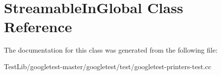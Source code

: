 \hypertarget{classStreamableInGlobal}{}\section{Streamable\+In\+Global Class Reference}
\label{classStreamableInGlobal}


The documentation for this class was generated from the following file\+:\begin{DoxyCompactItemize}
\item 
Test\+Lib/googletest-\/master/googletest/test/googletest-\/printers-\/test.\+cc\end{DoxyCompactItemize}
